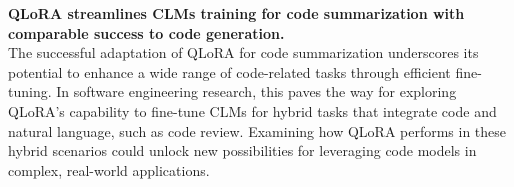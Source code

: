 \noindent\textbf{QLoRA streamlines CLMs training for code summarization with comparable success to code generation.}\\
The successful adaptation of QLoRA for code summarization underscores its potential to enhance a wide range of code-related tasks through efficient fine-tuning.
In software engineering research, this paves the way for exploring QLoRA's capability to fine-tune CLMs for hybrid tasks that integrate code and natural language, such as code review.
Examining how QLoRA performs in these hybrid scenarios could unlock new possibilities for leveraging code models in complex, real-world applications. 
